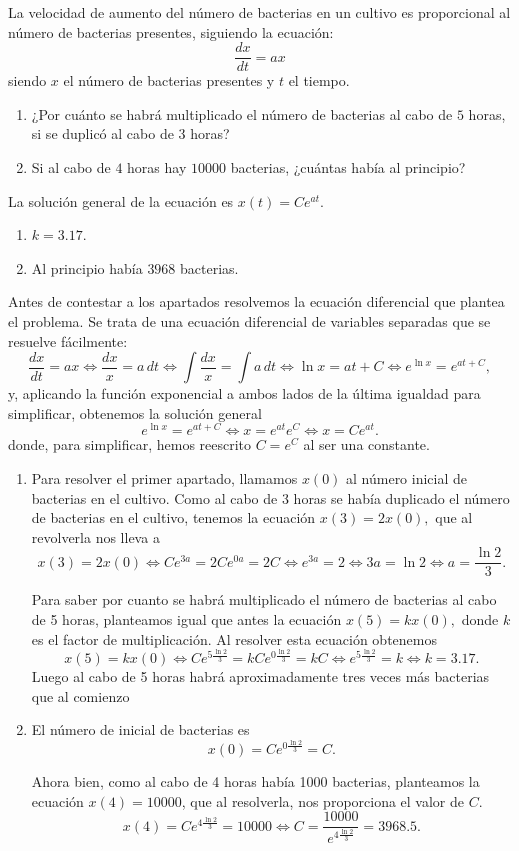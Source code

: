 {La velocidad de aumento del número de bacterias en un cultivo es proporcional al número de bacterias presentes, siguiendo la ecuación: 
\[
\frac{dx}{dt}=ax
\]
siendo $x$ el número de bacterias presentes y $t$ el tiempo.
\begin{enumerate}
\item  ¿Por cuánto se habrá multiplicado el número de bacterias al cabo de $5$ horas, si se duplicó al cabo de $3$ horas?
\item  Si al cabo de $4$ horas hay $10000$ bacterias,  ¿cuántas había al principio?
\end{enumerate}
}
{La solución general de la ecuación es $x(t)=Ce^{at}$.
\begin{enumerate}
\item $k=3.17$.
\item Al principio había $3968$ bacterias.
\end{enumerate}
}
{Antes de contestar a los apartados resolvemos la ecuación diferencial que plantea el problema. Se trata de una ecuación diferencial de variables separadas que se resuelve fácilmente: 
\[
\frac{dx}{dt}=ax \Longleftrightarrow \frac{dx}{x}=a\,dt \Longleftrightarrow 
\int \frac{dx}{x} = \int a\,dt \Longleftrightarrow \ln x = at+C \Longleftrightarrow
e^{\ln x}=e^{at+C},
\]
y, aplicando la función exponencial a ambos lados de la última igualdad para simplificar, obtenemos la solución general 
\[
e^{\ln x}=e^{at+C} \Longleftrightarrow x=e^{at}e^{C} \Longleftrightarrow x=Ce^{at}.
\]
donde, para simplificar, hemos reescrito $C=e^C$ al ser una constante.
\begin{enumerate}
\item Para resolver el primer apartado, llamamos $x(0)$ al número inicial de bacterias en el cultivo. Como al cabo de 3 horas se había duplicado el número de bacterias en el cultivo, tenemos la ecuación $x(3)=2x(0),$ que al revolverla nos lleva a 
\[
x(3)=2x(0) \Longleftrightarrow Ce^{3a}=2Ce^{0a}=2C \Longleftrightarrow
e^{3a}=2 \Longleftrightarrow 3a=\ln 2 \Longleftrightarrow a=\frac{\ln 2}{3}.
\]

Para saber por cuanto se habrá multiplicado el número de bacterias al cabo de 5 horas, planteamos igual que antes la ecuación $x(5)=kx(0),$ donde $k$ es el factor de multiplicación. Al resolver esta ecuación obtenemos 
\[
x(5)=kx(0)\Longleftrightarrow Ce^{5\frac{\ln 2}3}=kCe^{0\frac{\ln 2}{3}}=kC \Longleftrightarrow e^{5\frac{\ln 2}{3}}=k \Longleftrightarrow k=3.17.
\]
Luego al cabo de 5 horas habrá aproximadamente tres veces más bacterias que al comienzo

\item El número de inicial de bacterias es
\[
x(0)=Ce^{0\frac{\ln 2}3}=C.
\]

Ahora bien, como al cabo de 4 horas había 1000 bacterias, planteamos la ecuación $x(4)=10000$, que al resolverla, nos proporciona el valor de $%
C.$
\[
x(4)=Ce^{4\frac{\ln 2}{3}}=10000 \Longleftrightarrow C=\frac{10000}{e^{4\frac{\ln 2}3}} = 3968.5.
\]
\end{enumerate}
}


